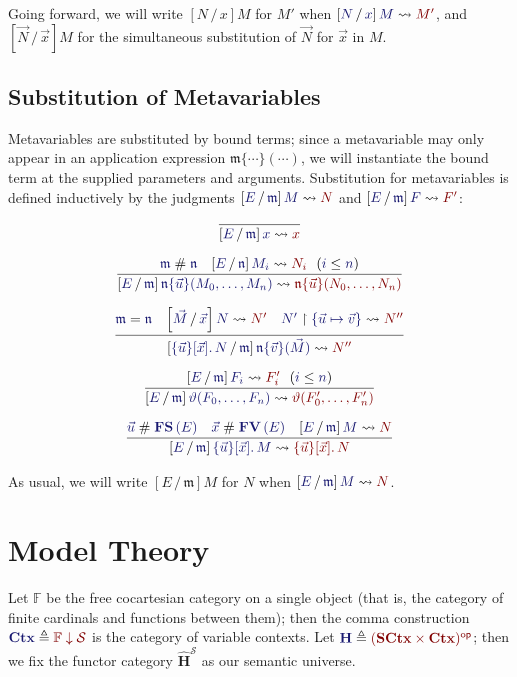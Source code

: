 \documentclass[11pt]{article}
\theoremstyle{definition}
\theoremstyle{remark}
\numberwithin{equation}{section}
\def\IModeColorName{MidnightBlue}
\def\OModeColorName{Maroon}
\newcommand\IMode[1]{{\color{\IModeColorName}{#1}}}
\newcommand\OMode[1]{{\color{\OModeColorName}{#1}}}
\newcommand\HypJ[2]{#1\ \ (#2)}
\newcommand\MkSet[1]{\left\{#1\right\}}
\newcommand\MkBTm[3]{\{#1\}[#2].\, #3}
\newcommand\Leq[2]{\IMode{#1}\leq\IMode{#2}}
\newcommand\FinSets{\mathbb{F}}
\newcommand\Sorts{\mathcal{S}}
\newcommand\SCtx{\mathbf{SCtx}}
\newcommand\Ctx{\mathbf{Ctx}}
\newcommand\HypCat{\mathbf{H}}
\newcommand\OpCat[1]{#1^{\mathsf{op}}}
\newcommand\Comma[2]{#1 \downarrow#2}
\newcommand\MV[1]{\mathfrak{#1}}
\newcommand\MApp[3]{#1\{#2\}(#3)}
\newcommand\App[2]{#1(#2)}
\newcommand\FV[1]{\mathbf{FV}\left(#1\right)}
\newcommand\FS[1]{\mathbf{FS}\left(#1\right)}
\newcommand\Rename[2]{%
  #2\upharpoonright#1%
}
\newcommand\IsRenaming[3]{%
  \Rename{\IMode{#1}}{\IMode{#2}}%
  \leadsto\OMode{#3}%
}
\newcommand\Subst[3]{%
  \left[#1\, /\, #2\right]#3%
}
\newcommand\IsSubst[4]{%
  \Subst{\IMode{#1}}{\IMode{#2}}{\IMode{#3}}%
  \leadsto\OMode{#4}%
}
\newcommand\IsEq[2]{\IMode{#1} = \IMode{#2}}
\newcommand\IsApart[2]{\IMode{#1} \mathrel{\#} \IMode{#2}}
\newcommand\Define[2]{\IMode{#1}\triangleq\OMode{#2}}
\begin{document}
Going forward, we will write $\Subst{N}{x}{M}$ for $M'$ when
$\IsSubst{N}{x}{M}{M'}$, and $\Subst{\vec{N}}{\vec{x}}{M}$ for the
simultaneous substitution of $\vec{N}$ for $\vec{x}$ in $M$.

\subsection{Substitution of Metavariables}

Metavariables are substituted by bound terms; since a metavariable may only
appear in an application expression $\MApp{\MV{m}}{\cdots}{\cdots}$, we will
instantiate the bound term at the supplied parameters and arguments.
Substitution for metavariables is defined inductively by the judgments
$\IsSubst{E}{\MV{m}}{M}{N}$ and $\IsSubst{E}{\MV{m}}{F}{F'}$:

\begin{gather*}
  \infer{
    \IsSubst{E}{\MV{m}}{x}{x}
  }{
  }\\[6pt]
  \infer{
    \IsSubst{E}{\MV{m}}{
      \MApp{\MV{n}}{\vec{u}}{M_0,\dots,M_n}
    }{
      \MApp{\MV{n}}{\vec{u}}{N_0,\dots,N_n}
    }
  }{
    \IsApart{\MV{m}}{\MV{n}} &
    \HypJ{
      \IsSubst{E}{\MV{n}}{M_i}{N_i}
    }{
      \Leq{i}{n}
    }
  }\\[6pt]
  \infer{
    \IsSubst{
      \MkBTm{\vec{u}}{\vec{x}}{N}
    }{\MV{m}}{
      \MApp{\MV{n}}{\vec{v}}{\vec{M}}
    }{
      N''
    }
  }{
    \IsEq{\MV{m}}{\MV{n}} &
    \IsSubst{\vec{M}}{\vec{x}}{N}{N'} &
    \IsRenaming{\MkSet{\vec{u}\mapsto\vec{v}}}{N'}{N''}
  }\\[6pt]
  \infer{
    \IsSubst{E}{\MV{m}}{
      \App{\vartheta}{F_0,\dots,F_n}
    }{
      \App{\vartheta}{F'_0,\dots,F'_n}
    }
  }{
    \HypJ{
      \IsSubst{E}{\MV{m}}{F_i}{F'_i}
    }{
      \Leq{i}{n}
    }
  }\\[6pt]
  \infer{
    \IsSubst{E}{\MV{m}}{
      \MkBTm{\vec{u}}{\vec{x}}{M}
    }{
      \MkBTm{\vec{u}}{\vec{x}}{N}
    }
  }{
    \IsApart{\vec{u}}{\FS{E}} &
    \IsApart{\vec{x}}{\FV{E}} &
    \IsSubst{E}{\MV{m}}{M}{N}
  }
\end{gather*}

As usual, we will write $\Subst{E}{\MV{m}}{M}$ for $N$ when
$\IsSubst{E}{\MV{m}}{M}{N}$.

\section{Model Theory}

Let $\FinSets$ be the free cocartesian category on a single object (that is,
the category of finite cardinals and functions between them); then the comma
construction $\Define{\Ctx}{\Comma{\FinSets}{\Sorts}}$ is the category of
variable contexts. Let $\Define{\HypCat}{\OpCat{(\SCtx\times\Ctx)}}$; then we
fix the functor category $\widehat{\HypCat}^\Sorts$ as our semantic universe.
\end{document}
